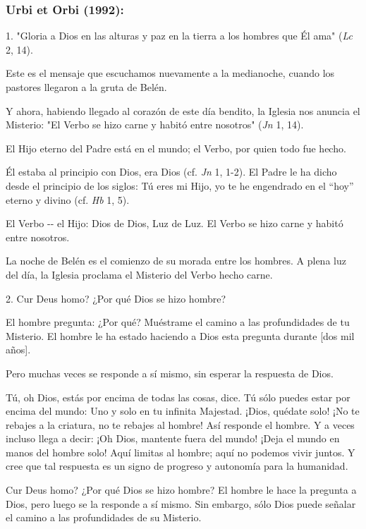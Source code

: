 \begin{body}
\subsubsection{Urbi et Orbi (1992): }

\begin{body} 
1. "Gloria a Dios en las alturas y paz en la tierra a los hombres que Él ama" (\emph{Lc} 2, 14).

Este es el mensaje que escuchamos nuevamente a la medianoche, cuando los pastores llegaron a la gruta de Belén.

Y ahora, habiendo llegado al corazón de este día bendito, la Iglesia nos anuncia el Misterio: "El Verbo se hizo carne y habitó entre nosotros" (\emph{Jn} 1, 14).

El Hijo eterno del Padre está en el mundo; el Verbo, por quien todo fue hecho.

Él estaba al principio con Dios, era Dios (cf. \emph{Jn} 1, 1-2). El Padre le ha dicho desde el principio de los siglos: Tú eres mi Hijo, yo te he engendrado en el ``hoy'' eterno y divino (cf. \emph{Hb} 1, 5).

El Verbo -\/- el Hijo: Dios de Dios, Luz de Luz. El Verbo se hizo carne y habitó entre nosotros.

La noche de Belén es el comienzo de su morada entre los hombres. A plena luz del día, la Iglesia proclama el Misterio del Verbo hecho carne.

2. Cur Deus homo? ¿Por qué Dios se hizo hombre?

El hombre pregunta: ¿Por qué? Muéstrame el camino a las profundidades de tu Misterio. El hombre le ha estado haciendo a Dios esta pregunta durante {[}dos mil años{]}.

Pero muchas veces se responde a sí mismo, sin esperar la respuesta de Dios.

Tú, oh Dios, estás por encima de todas las cosas, dice. Tú sólo puedes estar por encima del mundo: Uno y solo en tu infinita Majestad. ¡Dios, quédate solo! ¡No te rebajes a la criatura, no te rebajes al hombre! Así responde el hombre. Y a veces incluso llega a decir: ¡Oh Dios, mantente fuera del mundo! ¡Deja el mundo en manos del hombre solo! Aquí limitas al hombre; aquí no podemos vivir juntos. Y cree que tal respuesta es un signo de progreso y autonomía para la humanidad.

Cur Deus homo? ¿Por qué Dios se hizo hombre? El hombre le hace la pregunta a Dios, pero luego se la responde a sí mismo. Sin embargo, sólo Dios puede señalar el camino a las profundidades de su Misterio.


\end{body}
\end{body}
